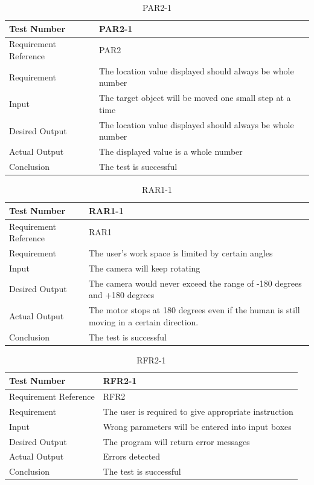 \documentclass[12pt, titlepage]{article}
\begin{document}
\begin{table}[H]
\begin{center}
\begin{tabular}{|l | m{9cm}|}
\hline
  Test Number & PAR2-1\\
  \hline
  Requirement Reference & PAR2\\
  \hline
  Requirement & The location value displayed should always be whole number\\
  \hline
  Input & The target object will be moved one small step at a time\\
  \hline
  Desired Output & The location value displayed should always be whole number\\
  \hline
  Actual Output & The displayed value is a whole number\\
  \hline
  Conclusion & The test is successful\\
  \hline
\end{tabular}
\end{center}     
\caption{PAR2-1}
\end{table}

\begin{table}[H]
\begin{center}
\begin{tabular}{|l | m{9cm}|}
\hline
  Test Number & RAR1-1\\
  \hline
  Requirement Reference & RAR1\\
  \hline
  Requirement & The user's work space is limited by certain angles\\
  \hline
  Input & The camera will keep rotating\\
  \hline
  Desired Output & The camera would never exceed the range of -180 degrees and +180 degrees\\
  \hline
  Actual Output & The motor stops at 180 degrees even if the human is still moving in a certain direction.\\
  \hline
  Conclusion & The test is successful\\
  \hline
\end{tabular}
\end{center}     
\caption{RAR1-1}
\end{table}

\begin{table}[H]
\begin{center}
\begin{tabular}{|l | m{9cm}|}
\hline
  Test Number & RFR2-1\\
  \hline
  Requirement Reference & RFR2\\
  \hline
  Requirement & The user is required to give appropriate instruction\\
  \hline
  Input & Wrong parameters will be entered into input boxes\\
  \hline
  Desired Output & The program will return error messages\\
  \hline
  Actual Output & Errors detected\\
  \hline
  Conclusion & The test is successful\\
  \hline
\end{tabular}
\end{center}     
\caption{RFR2-1}
\end{table}
\end{document}
